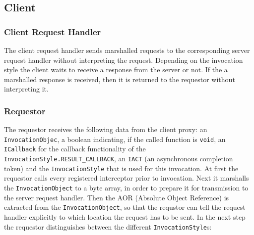 \subsection{Client}

\subsubsection{Client Request Handler}

The client request handler sends marshalled requests to the corresponding server request handler without interpreting the request.
Depending on the invocation style the client waits to receive a response from the server or not.
If the a marshalled response is received, then it is returned to the requestor without interpreting it.

\subsubsection{Requestor}
The requestor receives the following data from the client proxy: an \texttt{InvocationObjec}, a boolean indicating, if the called function is \texttt{void}, an \texttt{ICallback} for the callback functionality of the \texttt{InvocationStyle.RESULT\_CALLBACK}, an \texttt{IACT} (an asynchronous completion token) and the \texttt{InvocationStyle} that is used for this invocation. At first the requestor calls every registered interceptor prior to invocation. Next it marshalls the \texttt{InvocationObject} to a byte array, in order to prepare it for transmission to the server request handler. Then the AOR (Absolute Object Reference) is extracted from the \texttt{InvocationObject}, so that the requstor can tell the request handler explicitly to which location the request has to be sent. In the next step the requestor distinguishes between the different \texttt{InvocationStyle}s:
